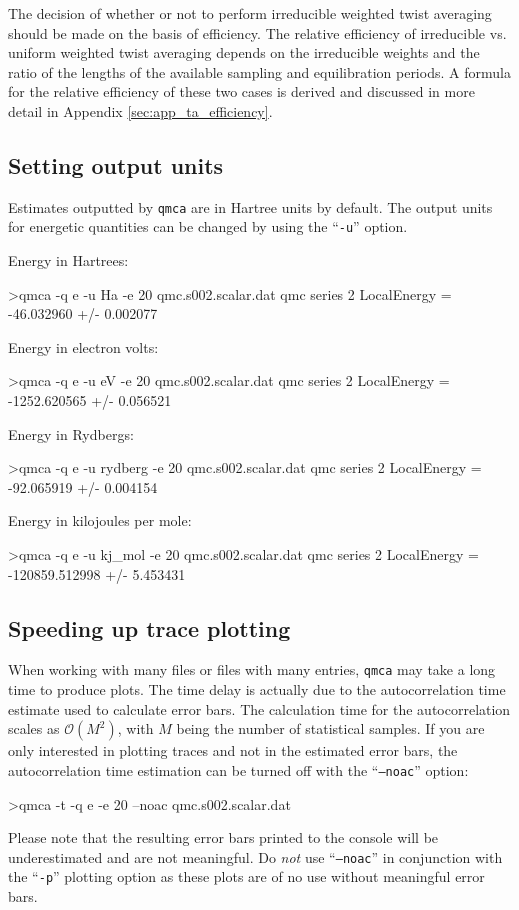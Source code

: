 The decision of whether or not to perform irreducible weighted twist 
averaging should be made on the basis of efficiency.  The relative 
efficiency of irreducible vs. uniform weighted twist averaging 
depends on the irreducible weights and the ratio of the lengths of 
the available sampling and equilibration periods.  A formula for 
the relative efficiency of these two cases is derived and discussed 
in more detail in Appendix \ref{sec:app_ta_efficiency}.


\subsection{Setting output units}
\label{sec:qmca_output_units}
Estimates outputted by \texttt{qmca} are in Hartree units by 
default.  The output units for energetic quantities can be 
changed by using the ``\texttt{-u}'' option.  

\vspace{3mm}
\noindent
Energy in Hartrees:
\begin{shade}
>qmca -q e -u Ha -e 20 qmc.s002.scalar.dat
qmc  series 2  LocalEnergy           =  -46.032960 +/- 0.002077
\end{shade}

\noindent
Energy in electron volts:
\begin{shade}
>qmca -q e -u eV -e 20 qmc.s002.scalar.dat
qmc  series 2  LocalEnergy           =  -1252.620565 +/- 0.056521 
\end{shade}

\noindent
Energy in Rydbergs:
\begin{shade}
>qmca -q e -u rydberg -e 20 qmc.s002.scalar.dat
qmc  series 2  LocalEnergy           =  -92.065919 +/- 0.004154   
\end{shade}

\noindent
Energy in kilojoules per mole:
\begin{shade}
>qmca -q e -u kj_mol -e 20 qmc.s002.scalar.dat
qmc  series 2  LocalEnergy           =  -120859.512998 +/- 5.453431   
\end{shade}


\subsection{Speeding up trace plotting}
\label{sec:qmca_fast_trace_plot}
When working with many files or files with many entries, 
\texttt{qmca} may take a long time to produce plots.  The time 
delay is actually due to the autocorrelation time estimate 
used to calculate error bars.  The calculation time for 
the autocorrelation scales as $\mathcal{O}(M^2)$, with $M$ being 
the number of statistical samples.  If you are only interested 
in plotting traces and not in the estimated error bars, the 
autocorrelation time estimation can be turned off with the 
``\texttt{--noac}'' option:
\begin{shade}
>qmca -t -q e -e 20 --noac qmc.s002.scalar.dat
\end{shade}
\noindent
Please note that the resulting error bars printed to the console 
will be underestimated and are not meaningful.  Do \emph{not} 
use ``\texttt{--noac}'' in conjunction with the ``\texttt{-p}'' 
plotting option as these plots are of no use without meaningful 
error bars.


